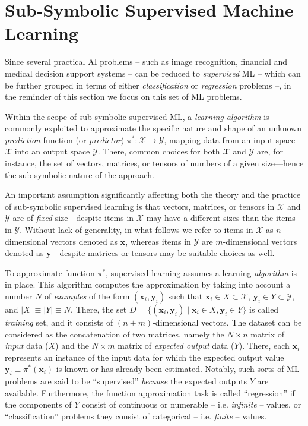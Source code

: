 \documentclass[12pt,a4paper,openright,twoside]{book}
\begin{document}
\section{Sub-Symbolic Supervised Machine Learning}

Since several practical AI problems -- such as image recognition, financial and medical decision support systems -- can be reduced to \emph{supervised} ML -- which can be further grouped in terms of either  \emph{classification} or \emph{regression} problems \cite{twala2010,smlreview-faia160} --, in the reminder of this section we focus on this set of ML problems. 

Within the scope of sub-symbolic supervised ML, a \emph{learning algorithm} is commonly exploited to approximate the specific nature and shape of an unknown \emph{prediction} function (or \emph{predictor}) $\pi^*: \mathcal{X} \rightarrow \mathcal{Y}$, mapping data from an input space $\mathcal{X}$ into an output space $\mathcal{Y}$.
%
There, common choices for both $\mathcal{X}$ and $\mathcal{Y}$ are, for instance, the set of vectors, matrices, or tensors of numbers of a given size---hence the sub-symbolic nature of the approach.

An important assumption significantly affecting both the theory and the practice of sub-symbolic supervised learning is that vectors, matrices, or tensors in $\mathcal{X}$ and $\mathcal{Y}$ are of \emph{fixed} size---despite items in $\mathcal{X}$ may have a different sizes than the items in $\mathcal{Y}$.
%
Without lack of generality, in what follows we refer to items in $\mathcal{X}$ as $n$-dimensional vectors denoted as $\mathbf{x}$, whereas items in $\mathcal{Y}$ are $m$-dimensional vectors denoted as $\mathbf{y}$---despite matrices or tensors may be suitable choices as well.

To approximate function $\pi^*$, supervised learning assumes a learning \emph{algorithm} is in place.
%
This algorithm computes the approximation by taking into account a number $N$ of \emph{examples} of the form $(\mathbf{x}_i,\mathbf{y}_i)$ such that $\mathbf{x}_i \in X \subset \mathcal{X}$, $\mathbf{y}_i \in Y \subset \mathcal{Y}$, and $|X| \equiv |Y| \equiv N$.
%
There, the set $D = \{ (\mathbf{x}_i,\mathbf{y}_i) \mid \mathbf{x}_i \in X, \mathbf{y}_i \in Y \}$ is called \emph{training} set, and it consists of $(n+m)$-dimensional vectors.
%
The dataset can be considered as the concatenation of two matrices, namely the $N \times n$ matrix of \emph{input} data ($X$) and the $N \times m$ matrix of \emph{expected output} data ($Y$).
%
There, each $\mathbf{x}_i$ represents an instance of the input data for which the expected output value $\mathbf{y}_i \equiv \pi^*(\mathbf{x}_i)$ is known or has already been estimated.
%
Notably, such sorts of ML problems are said to be ``supervised'' \emph{because} the expected outputs $Y$ are available.
%
Furthermore, the function approximation task is called ``regression'' if the components of $Y$ consist of continuous or numerable -- i.e. \emph{infinite} -- values, or ``classification'' problems they consist of categorical -- i.e. \emph{finite} -- values.
\end{document}
